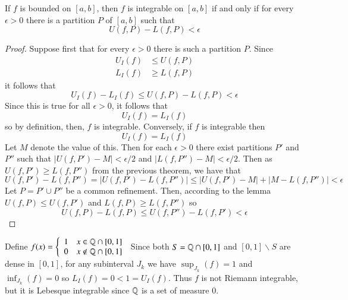 \begin{thm}
    If $f$ is bounded on $[a,b]$, then $f$ is integrable on $[a,b]$ if and only if for every $\epsilon > 0$ there is a partition $P$ of $[a, b]$ such that $$U(f,P) - L(f,P) < \epsilon$$
\end{thm}
\begin{proof}
    Suppose first that for every $\epsilon > 0$ there is such a partition $P$. Since \begin{align*}
        U_I(f) &\leq U(f,P) \\
        L_I(f) &\geq L(f,P)
    \end{align*}
    it follows that \begin{equation*}
        U_I(f) - L_I(f) \leq U(f,P) - L(f,P) < \epsilon
    \end{equation*}
    Since this is true for all $\epsilon > 0$, it follows that \begin{equation*}
        U_I(f) = L_I(f)
    \end{equation*}
    so by definition, then, $f$ is integrable. Conversely, if $f$ is integrable then \begin{equation*}
        U_I(f) = L_I(f)
    \end{equation*}
    Let $M$ denote the value of this. Then for each $\epsilon > 0$ there exist partitions $P'$ and $P''$ such that $|U(f,P') - M| <\epsilon/2$ and $|L(f,P'') - M| < \epsilon/2$. Then as $U(f,P') \geq L(f,P'')$ from the previous theorem, we have that \begin{equation*}
        U(f,P') - L(f,P'') = |U(f,P') - L(f,P'')| \leq |U(f,P') - M| + |M - L(f,P'')| < \epsilon
    \end{equation*}
    Let $P = P' \cup P''$ be a common refinement. Then, according to the lemma $U(f,P) \leq U(f,P')$ and $L(f,P) \geq L(f,P'')$ so \begin{equation*}
		U(f,P) - L(f,P) \leq U(f,P'') - L(f,P') <\epsilon
	\end{equation*}
\end{proof}

\begin{eg}
    Define $f(x) = \left\{\begin{array}{cc} 1 & x \in \mathbb Q\cap[0,1] \\ 0 & x \notin \mathbb Q\cap [0,1]  \end{array}\right.$ Since both $S = \mathbb Q\cap [0,1]$ and $[0,1]\backslash S$ are dense in $[0,1]$, for any subinterval $J_k$ we have $\sup_{J_k}(f) = 1$ and $\inf_{J_k}(f) = 0$ so $L_I(f) = 0 < 1 = U_I(f)$. Thus $f$ is not Riemann integrable, but it is Lebesque integrable since $\mathbb Q$ is a set of measure $0$.
\end{eg}


